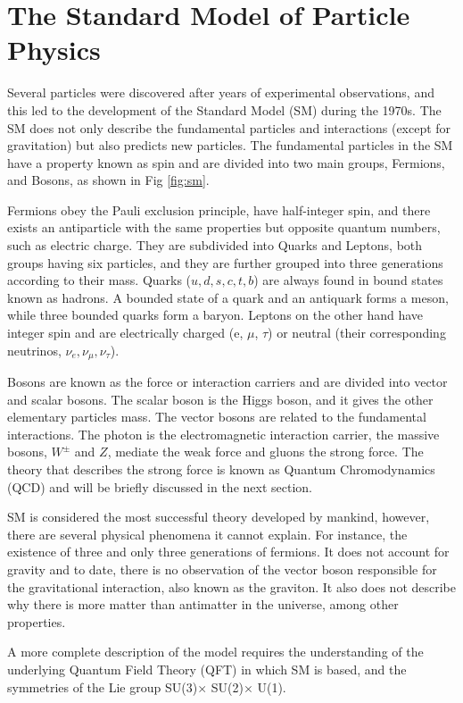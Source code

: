 \chapter{\leavevmode\newline The Standard Model of Particle Physics}
\label{chap:chapter_1}
Several particles were discovered after years of experimental observations, and this led to the development of the Standard Model (SM) during the 1970s. The SM does not only describe the fundamental particles and interactions (except for gravitation) but also predicts new particles. The fundamental particles in the SM have a property known as spin and are divided into two main groups, Fermions, and Bosons, as shown in Fig \ref{fig:sm}.

Fermions obey the Pauli exclusion principle, have half-integer spin, and there exists an antiparticle with the same properties but opposite quantum numbers, such as electric charge. They are subdivided into Quarks and Leptons, both groups having six particles, and they are further grouped into three generations according to their mass. Quarks ($u, d, s, c, t, b$) are always found in bound states known as hadrons. A bounded state of a quark and an antiquark forms a meson, while three bounded quarks form a baryon. Leptons on the other hand have integer spin and are electrically charged (e, $\mu$, $\tau$) or neutral (their corresponding neutrinos, $\nu_e, \nu_\mu, \nu_\tau$).

Bosons are known as the force or interaction carriers and are divided into vector and scalar bosons. The scalar boson is the Higgs boson, and it gives the other elementary particles mass. The vector bosons are related to the fundamental interactions. The photon is the electromagnetic interaction carrier, the massive bosons, $W^{\pm}$ and $Z$, mediate the weak force and gluons the strong force. The theory that describes the strong force is known as Quantum Chromodynamics (QCD) and will be briefly discussed in the next section.

SM is considered the most successful theory developed by mankind, however, there are several physical phenomena it cannot explain. For instance, the existence of three and only three generations of fermions. It does not account for gravity and to date, there is no observation of the vector boson responsible for the gravitational interaction, also known as the graviton. It also does not describe why there is more matter than antimatter in the universe, among other properties.

A more complete description of the model requires the understanding of the underlying Quantum Field Theory (QFT) in which SM is based, and the symmetries of the Lie group SU(3)$ \times$ SU(2)$ \times$ U(1).

